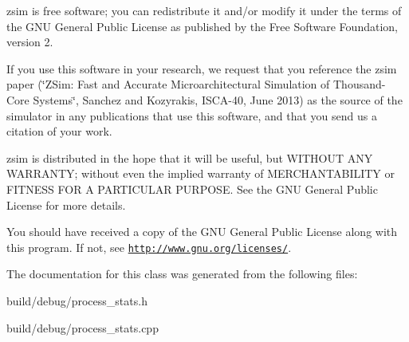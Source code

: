 zsim is free software; you can redistribute it and/or modify it under the terms of the G\-N\-U General Public License as published by the Free Software Foundation, version 2.

If you use this software in your research, we request that you reference the zsim paper (\char`\"{}\-Z\-Sim\-: Fast and Accurate Microarchitectural Simulation of
\-Thousand-\/\-Core Systems\char`\"{}, Sanchez and Kozyrakis, I\-S\-C\-A-\/40, June 2013) as the source of the simulator in any publications that use this software, and that you send us a citation of your work.

zsim is distributed in the hope that it will be useful, but W\-I\-T\-H\-O\-U\-T A\-N\-Y W\-A\-R\-R\-A\-N\-T\-Y; without even the implied warranty of M\-E\-R\-C\-H\-A\-N\-T\-A\-B\-I\-L\-I\-T\-Y or F\-I\-T\-N\-E\-S\-S F\-O\-R A P\-A\-R\-T\-I\-C\-U\-L\-A\-R P\-U\-R\-P\-O\-S\-E. See the G\-N\-U General Public License for more details.

You should have received a copy of the G\-N\-U General Public License along with this program. If not, see \href{http://www.gnu.org/licenses/}{\tt http\-://www.\-gnu.\-org/licenses/}. 

The documentation for this class was generated from the following files\-:\begin{DoxyCompactItemize}
\item 
build/debug/process\-\_\-stats.\-h\item 
build/debug/process\-\_\-stats.\-cpp\end{DoxyCompactItemize}

